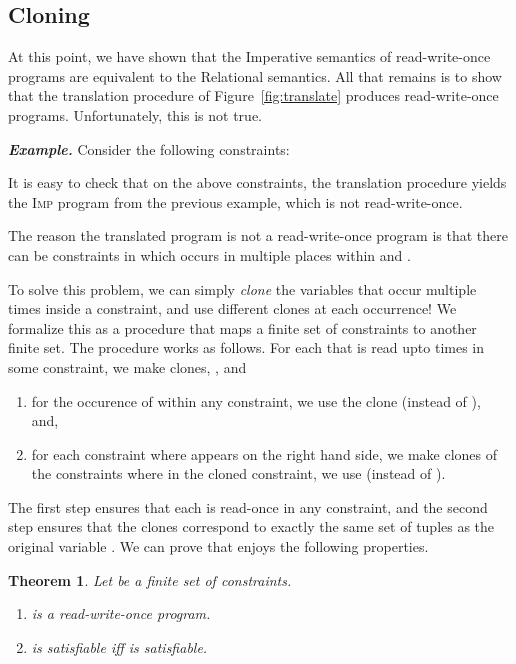 \documentclass[nocopyrightspace]{sigplanconf}
\makeatletter
\newtheorem{@protheo}{Theorem}
\newenvironment{theorem}[1]{\begin{@protheo}{\rm \bf #1}\it}{\end{@protheo}}
\def\myexsh{\smallskip\noindent\textbf{\emph{Example.}\xspace}}
\newcommand{\ilang}{\textsc{Imp}\xspace}
\def\RELSEM{{Relational}\xspace}
\def\IMPSEM{{Imperative}\xspace}
\makeatother
\begin{document}
\subsection{Cloning}
\label{sec:cloning}

At this point, we have shown that the \IMPSEM semantics of
read-write-once programs are equivalent to the \RELSEM semantics.
All that remains is to show that the translation procedure of
Figure~\ref{fig:translate} produces read-write-once programs.
Unfortunately, this is not true.

\myexsh
Consider the following constraints:

It is easy to check that on the above constraints, the translation
procedure yields the \ilang program from the previous example, which is not
read-write-once.

The reason the translated program is not a read-write-once program is that 
there can be constraints  
in which  occurs in multiple places within  and .

To solve this problem, we can simply \emph{clone} the  variables 
that occur multiple times inside a constraint, and use different clones 
at each occurrence!
We formalize this as a procedure  that maps a finite set of 
constraints to another finite set. The procedure works as follows. 
For each  that is read upto  times in some constraint, we 
make  clones, , and 
\begin{enumerate}
\item for the  occurence of  within any constraint, 
    we use the  clone  (instead of ), and,
\item for each constraint where  appears on the right hand side, 
    we make  clones of the constraints where in the  cloned constraint, 
    we use  (instead of ). 
\end{enumerate}
The first step ensures that each  is read-once in any constraint, and
the second step ensures that the clones correspond to exactly the same set of tuples 
as the original variable .
We can prove that  enjoys the following properties.

\begin{theorem}{}\label{th:clone}
Let  be a finite set of constraints.
\begin{enumerate}
\item  is a read-write-once program.
\item  is satisfiable iff  is satisfiable.
\end{enumerate}
\end{theorem}
\end{document}
